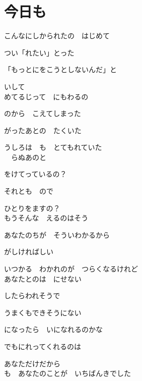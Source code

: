 \section{ 今日も}
\large{

こんなにしかられたの　はじめて

つい「れたい」とった

「もっとにをこうとしないんだ」と

いして
\\

めてるじって　にもわるの

のから　こえてしまった

がったあとの　たくいた

うしろは　も　とてもれていた
\\

　らぬあのと

をけてっているの？

それとも　ので

ひとりをますの？
\\

もうそんな　えるのはそう

あなたのちが　そういわかるから

がしければしい

いつかる　わかれのが　つらくなるけれど
\\

あなたとのは　にせない

したらわれそうで

うまくもできそうにない

になったら　いになれるのかな

でもにれってくれるのは

あなただけだから
\\

も　あなたのことが　いちばんきでした

}